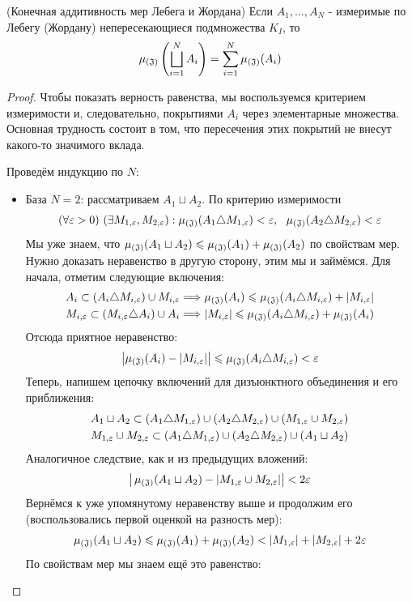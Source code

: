 \begin{theorem} (Конечная аддитивность мер Лебега и Жордана)
	Если $A_1, \ldots, A_N$ - измеримые по Лебегу (Жордану) непересекающиеся подмножества $K_I$, то 
	\[
		\operatorname{\mu_{(\mathfrak{J})}} \left(\bigsqcup_{i = 1}^N A_i\right) = \sum_{i = 1}^N \operatorname{\mu_{(\mathfrak{J})}}(A_i)
	\]
\end{theorem}

\begin{proof}
	Чтобы показать верность равенства, мы воспользуемся критерием измеримости и, следовательно, покрытиями $A_i$ через элементарные множества. Основная трудность состоит в том, что пересечения этих покрытий не внесут какого-то значимого вклада.
	
	Проведём индукцию по $N$:
	\begin{itemize}
		\item База $N = 2$: рассматриваем $A_1 \sqcup A_2$. По критерию измеримости
		\[
			(\forall \varepsilon > 0)\ (\exists M_{1, \varepsilon}, M_{2, \varepsilon}) : \operatorname{\mu_{(\mathfrak{J})}}(A_1 \triangle M_{1, \varepsilon}) < \varepsilon,\ \ \operatorname{\mu_{(\mathfrak{J})}}(A_2 \triangle M_{2, \varepsilon}) < \varepsilon
		\]
		Мы уже знаем, что $\operatorname{\mu_{(\mathfrak{J})}}(A_1 \sqcup A_2) \leqslant \operatorname{\mu_{(\mathfrak{J})}}(A_1) + \operatorname{\mu_{(\mathfrak{J})}}(A_2)$ по свойствам мер. Нужно доказать неравенство в другую сторону, этим мы и займёмся. Для начала, отметим следующие включения:
		\begin{align*}
			&{A_i \subset (A_i \triangle M_{i, \varepsilon}) \cup M_{i, \varepsilon} \Longrightarrow \operatorname{\mu_{(\mathfrak{J})}}(A_i) \leqslant \operatorname{\mu_{(\mathfrak{J})}}(A_i \triangle M_{i, \varepsilon}) + |M_{i, \varepsilon}|}
			\\
			&{M_{i, \varepsilon} \subset (M_{i, \varepsilon} \triangle A_i) \cup A_i \Longrightarrow |M_{i, \varepsilon}| \leqslant \operatorname{\mu_{(\mathfrak{J})}}(A_i \triangle M_{i, \varepsilon}) + \operatorname{\mu_{(\mathfrak{J})}}(A_i)}
		\end{align*}
		Отсюда приятное неравенство:
		\[
			\left|\operatorname{\mu_{(\mathfrak{J})}}(A_i) - |M_{i, \varepsilon}|\right| \leqslant \operatorname{\mu_{(\mathfrak{J})}}(A_i \triangle M_{i, \varepsilon}) < \varepsilon
		\]
		Теперь, напишем цепочку включений для дизъюнктного объединения и его приближения:
		\begin{align*}
			&{A_1 \sqcup A_2 \subset (A_1 \triangle M_{1, \varepsilon}) \cup (A_2 \triangle M_{2, \varepsilon}) \cup (M_{1, \varepsilon} \cup M_{2, \varepsilon})}
			\\
			&{M_{1, \varepsilon} \cup M_{2, \varepsilon} \subset (A_1 \triangle M_{1, \varepsilon}) \cup (A_2 \triangle M_{2, \varepsilon}) \cup (A_1 \sqcup A_2)}
		\end{align*}
		Аналогичное следствие, как и из предыдущих вложений:
		\[
			\big|\operatorname{\mu_{(\mathfrak{J})}}(A_1 \sqcup A_2) - |M_{1, \varepsilon} \cup M_{2, \varepsilon}|\big| < 2\varepsilon
		\]
		Вернёмся к уже упомянутому неравенству выше и продолжим его (воспользовались первой оценкой на разность мер):
		\[
			\operatorname{\mu_{(\mathfrak{J})}}(A_1 \sqcup A_2) \leqslant \operatorname{\mu_{(\mathfrak{J})}}(A_1) + \operatorname{\mu_{(\mathfrak{J})}}(A_2) < |M_{1, \varepsilon}| + |M_{2, \varepsilon}| + 2\varepsilon
		\]
		По свойствам мер мы знаем ещё это равенство:

\end{itemize}
\end{proof}
